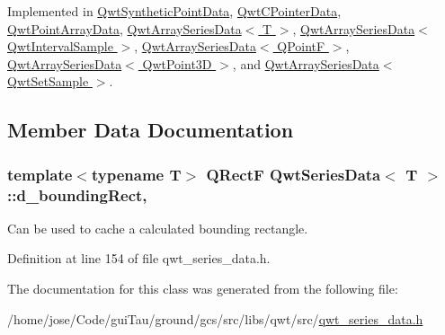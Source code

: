 Implemented in \hyperlink{class_qwt_synthetic_point_data_a61b2cc26e1b5fa4a64e29273cf3e1599}{Qwt\-Synthetic\-Point\-Data}, \hyperlink{class_qwt_c_pointer_data_a780b9ae434856509cef9bbe954f03a3e}{Qwt\-C\-Pointer\-Data}, \hyperlink{class_qwt_point_array_data_a2222b2ad6346dc6357a412fc50ec8f56}{Qwt\-Point\-Array\-Data}, \hyperlink{class_qwt_array_series_data_a52c123dcc321a03ccd18c2c138318025}{Qwt\-Array\-Series\-Data$<$ T $>$}, \hyperlink{class_qwt_array_series_data_a52c123dcc321a03ccd18c2c138318025}{Qwt\-Array\-Series\-Data$<$ Qwt\-Interval\-Sample $>$}, \hyperlink{class_qwt_array_series_data_a52c123dcc321a03ccd18c2c138318025}{Qwt\-Array\-Series\-Data$<$ Q\-Point\-F $>$}, \hyperlink{class_qwt_array_series_data_a52c123dcc321a03ccd18c2c138318025}{Qwt\-Array\-Series\-Data$<$ Qwt\-Point3\-D $>$}, and \hyperlink{class_qwt_array_series_data_a52c123dcc321a03ccd18c2c138318025}{Qwt\-Array\-Series\-Data$<$ Qwt\-Set\-Sample $>$}.



\subsection{Member Data Documentation}
\hypertarget{class_qwt_series_data_a24fbbcb0baa0c728117d2e6764d00414}{
\subsubsection[{d\-\_\-bounding\-Rect}]{\setlength{\rightskip}{0pt plus 5cm}template$<$typename T$>$ Q\-Rect\-F {\bf Qwt\-Series\-Data}$<$ T $>$\-::d\-\_\-bounding\-Rect\hspace{0.3cm}{\ttfamily [mutable]}, {\ttfamily [protected]}}}\label{class_qwt_series_data_a24fbbcb0baa0c728117d2e6764d00414}


Can be used to cache a calculated bounding rectangle. 



Definition at line 154 of file qwt\-\_\-series\-\_\-data.\-h.



The documentation for this class was generated from the following file\-:\begin{DoxyCompactItemize}
\item 
/home/jose/\-Code/gui\-Tau/ground/gcs/src/libs/qwt/src/\hyperlink{qwt__series__data_8h}{qwt\-\_\-series\-\_\-data.\-h}\end{DoxyCompactItemize}
